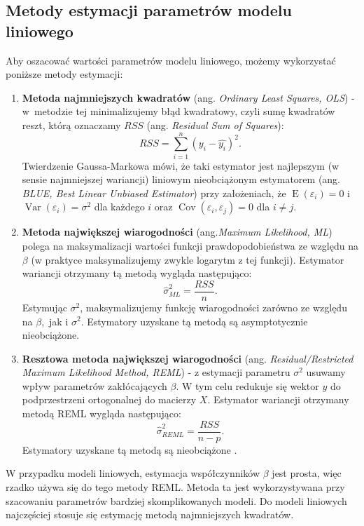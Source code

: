 \documentclass[12pt]{mwbk}
\theoremstyle{plain}
\theoremstyle{definition}
\theoremstyle{definition}
\begin{document}
\subsection{Metody estymacji parametrów modelu liniowego}
Aby oszacować wartości parametrów modelu liniowego, możemy wykorzystać poniższe metody estymacji:
\begin{enumerate}
	\item \textbf{Metoda najmniejszych kwadratów} (ang. \emph{Ordinary Least Squares, OLS}) - w~metodzie tej minimalizujemy błąd kwadratowy, czyli sumę kwadratów reszt, którą oznaczamy $RSS$ (ang. \emph{Residual Sum of Squares}):
	$$RSS= \sum_{i=1}^{n}(y_i-\hat{y_i})^2.$$
	Twierdzenie Gaussa-Markowa mówi, że taki estymator jest najlepszym (w sensie najmniejszej wariancji) liniowym nieobciążonym estymatorem (ang. \textit{BLUE, Best Linear Unbiased Estimator}) przy założeniach, że $\operatorname{E}(\varepsilon_i)=0$ i $\operatorname{Var}(\varepsilon_i)=\sigma^2$ dla każdego $i$ oraz $\operatorname{Cov}(\varepsilon_i, \varepsilon_j)=0$ dla $i \neq j$.

	\item \textbf{Metoda największej wiarogodności} (ang.\textit{Maximum Likelihood, ML}) polega na maksymalizacji wartości funkcji prawdopodobieństwa ze względu na $\beta$ (w praktyce maksymalizujemy zwykle logarytm z tej funkcji). Estymator wariancji otrzymany tą metodą wygląda następująco:
	$$\hat{\sigma}^{2}_{ML}=\frac{RSS}{n}.$$
	Estymując $\sigma^2$, maksymalizujemy funkcję wiarogodności zarówno ze względu na $\beta$,~jak i $\sigma^2$.
	Estymatory uzyskane tą metodą są asymptotycznie nieobciążone.
	
	\item \textbf{Resztowa metoda największej wiarogodności} (ang. \textit{Residual/Restricted Maximum Likelihood Method, REML}) - z estymacji parametru $\sigma^2$ usuwamy wpływ parametrów zakłócających $\beta$. W tym celu redukuje się wektor $y$ do podprzestrzeni ortogonalnej do macierzy $X$. Estymator wariancji otrzymany metodą REML wygląda następująco:
	$$\hat{\sigma}^2_{REML}=\frac{RSS}{n-p}.$$
	Estymatory uzyskane tą metodą są nieobciążone \cite{biecek}.
\end{enumerate}

W przypadku modeli liniowych, estymacja współczynników $\beta$ jest prosta, więc rzadko używa się do tego metody REML. Metoda ta jest wykorzystywana przy szacowaniu parametrów bardziej skomplikowanych modeli. Do modeli liniowych najczęściej stosuje się estymację metodą najmniejszych kwadratów.
\end{document}
